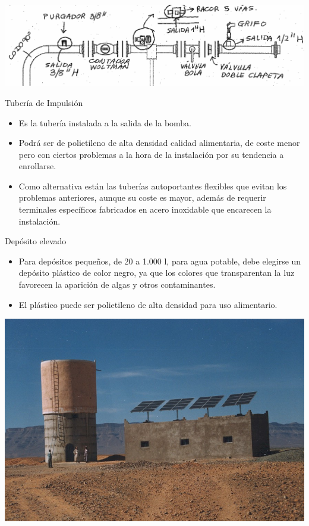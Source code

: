 \documentclass[xcolor={usenames,svgnames,dvipsnames}]{beamer}
\begin{document}
\begin{frame}[label=sec-4-0-2]{}
\includegraphics[width=.9\linewidth]{../figs/CircuitoHidraulico.pdf}
\end{frame}

\begin{frame}[label=sec-4-0-3]{Tubería de Impulsión}
\begin{itemize}
\item Es la tubería instalada a la salida de la bomba.

\item Podrá ser de polietileno de alta densidad calidad alimentaria, de
coste menor pero con ciertos problemas a la hora de la instalación
por su tendencia a enrollarse.

\item Como alternativa están las tuberías autoportantes flexibles que
evitan los problemas anteriores, aunque su coste es mayor, además de
requerir terminales específicos fabricados en acero inoxidable que
encarecen la instalación.
\end{itemize}
\end{frame}

\begin{frame}[label=sec-4-0-4]{Depósito elevado}
\begin{itemize}
\item Para depósitos pequeños, de 20 a 1.000 l, para agua potable, debe
elegirse un depósito plástico de color negro, ya que los colores que
transparentan la luz favorecen la aparición de algas y otros
contaminantes.

\item El plástico puede ser polietileno de alta densidad para uso
alimentario.
\end{itemize}
\end{frame}



\begin{frame}[label=sec-4-0-5]{}
\includegraphics[width=.9\linewidth]{../figs/Bombeo.jpg}
\end{frame}
\end{document}
